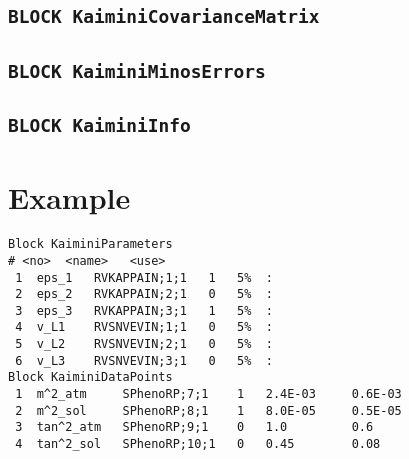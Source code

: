 \documentclass[a4paper,12pt]{article}
\begin{document}
\subsection*{\tt{BLOCK KaiminiCovarianceMatrix}}

\subsection*{\tt{BLOCK KaiminiMinosErrors}}

\subsection*{\tt{BLOCK KaiminiInfo}}


\appendix

\section{Example}

\begin{Verbatim}[frame=single]
Block KaiminiParameters
# <no>  <name>   <use> 
 1  eps_1   RVKAPPAIN;1;1   1   5%  :
 2  eps_2   RVKAPPAIN;2;1   0   5%  :
 3  eps_3   RVKAPPAIN;3;1   1   5%  :
 4  v_L1    RVSNVEVIN;1;1   0   5%  :
 5  v_L2    RVSNVEVIN;2;1   0   5%  :
 6  v_L3    RVSNVEVIN;3;1   0   5%  :
Block KaiminiDataPoints
 1  m^2_atm     SPhenoRP;7;1    1   2.4E-03     0.6E-03
 2  m^2_sol     SPhenoRP;8;1    1   8.0E-05     0.5E-05
 3  tan^2_atm   SPhenoRP;9;1    0   1.0         0.6
 4  tan^2_sol   SPhenoRP;10;1   0   0.45        0.08
\end{Verbatim}

\pagebreak


\end{document}
